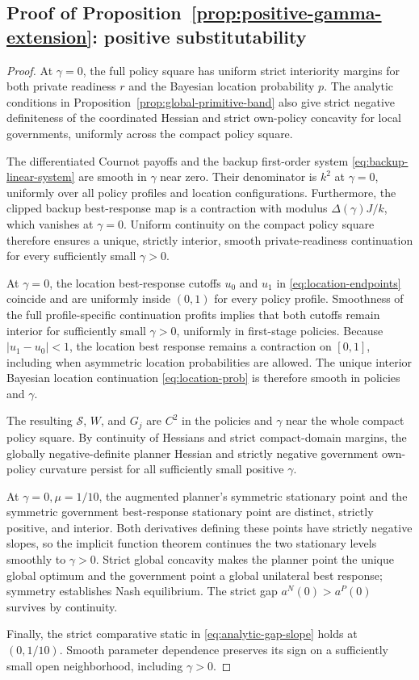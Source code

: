 \subsection{Proof of Proposition~\ref{prop:positive-gamma-extension}: positive substitutability}\label{app:jpet-additional-proof-2}

\begin{proof}
At $\gamma=0$, the full policy square has uniform strict
interiority margins for both private readiness $r$ and the
Bayesian location probability $p$. The analytic conditions in
Proposition~\ref{prop:global-primitive-band} also give strict
negative definiteness of the coordinated Hessian and strict
own-policy concavity for local governments, uniformly across
the compact policy square.

The differentiated Cournot payoffs and the backup first-order
system \eqref{eq:backup-linear-system} are smooth in $\gamma$ near
zero. Their denominator is $k^2$ at $\gamma=0$, uniformly over
all policy profiles and location configurations. Furthermore,
the clipped backup best-response map is a contraction with
modulus $\Delta(\gamma)J/k$, which vanishes at $\gamma=0$.
Uniform continuity on the compact policy square therefore
ensures a unique, strictly interior, smooth private-readiness
continuation for every sufficiently small $\gamma>0$.

At $\gamma=0$, the location best-response cutoffs $u_0$
and $u_1$ in \eqref{eq:location-endpoints} coincide and
are uniformly inside $(0,1)$ for every policy profile.
Smoothness of the full profile-specific continuation
profits implies that both cutoffs remain interior for
sufficiently small $\gamma>0$, uniformly in first-stage policies.
Because $|u_1-u_0|<1$, the location best response remains a
contraction on $[0,1]$, including when asymmetric location
probabilities are allowed. The unique interior Bayesian
location continuation \eqref{eq:location-prob} is therefore
smooth in policies and $\gamma$.

The resulting $\mathcal S$, $W$, and $G_j$ are $C^2$ in the
policies and $\gamma$ near the whole compact policy square.
By continuity of Hessians and strict compact-domain margins,
the globally negative-definite planner Hessian and strictly
negative government own-policy curvature persist for all
sufficiently small positive $\gamma$.

At $\gamma=0,\mu=1/10$, the augmented planner's symmetric
stationary point and the symmetric government best-response
stationary point are distinct, strictly positive, and interior.
Both derivatives defining these points have strictly negative
slopes, so the implicit function theorem continues the
two stationary levels smoothly to $\gamma>0$.
Strict global concavity makes the planner point the unique
global optimum and the government point a global unilateral
best response; symmetry establishes Nash equilibrium.
The strict gap $a^N(0)>a^P(0)$ survives by continuity.

Finally, the strict comparative static in
\eqref{eq:analytic-gap-slope} holds at $(0,1/10)$.
Smooth parameter dependence preserves its sign on a
sufficiently small open neighborhood, including $\gamma>0$.
\end{proof}

